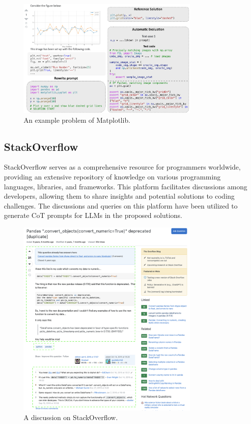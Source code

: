 \documentclass[a4paper,oneside]{book}
\begin{document}
\begin{figure}[H]
  \centering
  \includegraphics[width=0.8\textwidth]{img/ds1000_example}
  \caption{An example problem of Matplotlib.}\label{fig:ds1000_example}
\end{figure}

\subsection{StackOverflow}
StackOverflow serves as a comprehensive resource for programmers worldwide, providing an extensive repository of knowledge on various programming languages, libraries, and frameworks. This platform facilitates discussions among developers, allowing them to share insights and potential solutions to coding challenges. The discussions and queries on this platform have been utilized to generate CoT prompts for LLMs in the proposed solutions.

\begin{figure}[H]
  \centering
  \includegraphics[width=0.8\textwidth]{img/stackoverflow}
  \caption{A discussion on StackOverflow.}\label{fig:stackoverflow}
\end{figure}
\end{document}
